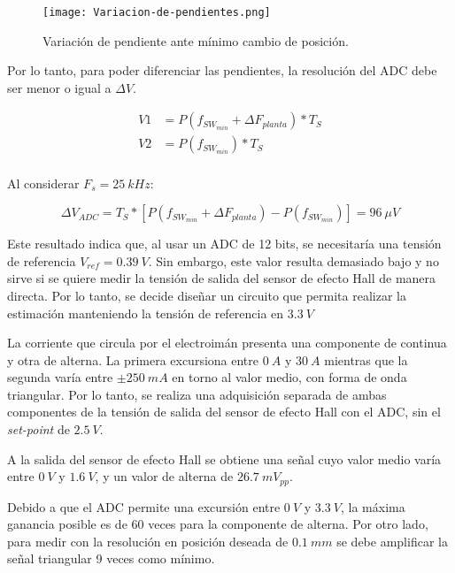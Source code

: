 \begin{figure}[H]
	\centering
	\texttt{[image: Variacion-de-pendientes.png]}
	\caption{Variación de pendiente ante mínimo cambio de posición.}
	\label{fig:variacion-de-pendiente}
\end{figure}

\noindent Por lo tanto, para poder diferenciar las pendientes, la resolución del ADC debe ser menor o igual a $\Delta V$.

\begin{equation} 
	\begin{aligned}
		V1 &= P(f_{SW_{min}} + \Delta F_{planta})* T_S \\
		V2 &= P(f_{SW_{min}})* T_S \\		 
	\end{aligned}
\end{equation}

\noindent Al considerar $F_s = 25\:kHz$:

\begin{equation} 
	\Delta V_{ADC} = T_S * [P(f_{SW_{min}} + \Delta F_{planta}) - P(f_{SW_{min}})] = 96\:\mu V
\end{equation}



\noindent Este resultado indica que, al usar un ADC de 12 bits, se necesitaría una tensión de referencia $V_{ref} = 0.39\:V$. Sin embargo, este valor resulta demasiado bajo y no sirve si se quiere medir la tensión de salida del sensor de efecto Hall de manera directa. Por lo tanto, se decide diseñar un circuito que permita realizar la estimación manteniendo la tensión de referencia en $3.3\:V$

\noindent La corriente que circula por el electroimán presenta una componente de continua y otra de alterna. La primera excursiona entre $0\:A$ y $30\:A$ mientras que la segunda varía entre $\pm 250\:mA$ en torno al valor medio, con forma de onda triangular. Por lo tanto, se realiza una adquisición separada de ambas componentes de la tensión de salida del sensor de efecto Hall con el ADC, sin el \textsl{set-point} de $2.5\:V$.

\noindent A la  salida del sensor de efecto Hall se obtiene una señal cuyo valor medio varía entre $0\:V$ y $1.6\:V$, y un valor de alterna de $26.7\:mV_{pp}$.

\noindent Debido a que el ADC permite una excursión entre $0\:V$ y $3.3\:V$, la máxima ganancia posible es de 60 veces para la componente de alterna. Por otro lado, para medir con la resolución en posición deseada de $0.1\:mm$ se debe amplificar la señal triangular 9 veces como mínimo.


